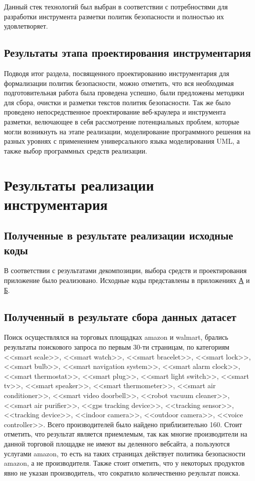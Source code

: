 \documentclass[../main]{subfiles}
\begin{document}
Данный стек технологий был выбран в соответствии с потребностями для разработки инструмента разметки политик безопасности и полностью их удовлетворяет.

\subsection{Результаты этапа проектирования инструментария}
Подводя итог раздела, посвященного проектированию инструментария для формализации политик безопасности, можно отметить, что вся необходимая подготовительная работа была проведена успешно, были предложены методики для сбора, очистки и разметки текстов политик безопасности. Так же было проведено непосредственное проектирование веб-краулера и инструмента разметки, велючающее в себя рассмотрение потенциальных проблем, которые могли возникнуть на этапе реализации, моделирование программного решения на разных уровнях с применением универсального языка моделирования UML, а также выбор программных средств реализации.

\newpage
\section{Результаты реализации инструментария}

\subsection{Полученные в результате реализации исходные коды}
В соответствии с результатами декомпозиции, выбора средств и проектирования приложение было реализовано. Исходные коды представлены в приложениях \hyperref[sec:appendix1]{А} и \hyperref[sec:appendix2]{Б}.

\subsection{Полученный в результате сбора данных датасет}
Поиск осуществлялся на торговых площадках amazon и walmart, брались результаты поискового запроса по первым 30-ти страницам, по категориям <<smart scale>>, <<smart watch>>, <<smart bracelet>>, <<smart lock>>, <<smart bulb>>, <<smart navigation system>>, <<smart alarm clock>>, <<smart thermostat>>, <<smart plug>>, <<smart light switch>>, <<smart tv>>, <<smart speaker>>, <<smart thermometer>>, <<smart air conditioner>>, <<smart video doorbell>>, <<robot vacuum cleaner>>, <<smart air pu\-ri\-fi\-er>>, <<gps tracking device>>, <<tracking sensor>>, <<tracking device>>, <<indoor came\-ra>>, <<outdoor camera>>, <<voice controller>>. Всего производителей было найдено приблизительно 160. Стоит отметить, что результат является приемлемым, так как многие производители на данной торговой площадке не имеют вы деленного вебсайта, а пользуются услугами amazon, то есть на таких страницах действует политика безопасности amazon, а не производителя. Также стоит отметить, что у некоторых продуктов явно не указан производитель, что    сократило количественно результат поиска.
\end{document}
